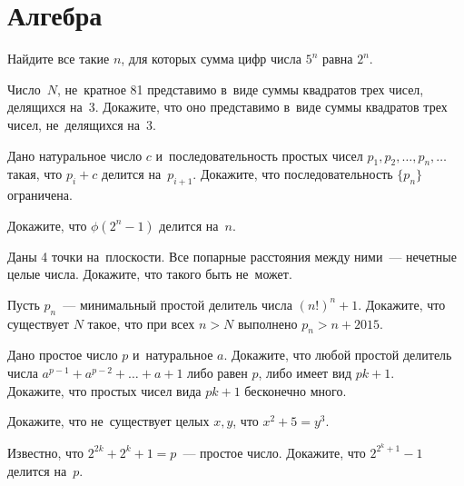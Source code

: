 

\section*{Алгебра}


\begin{problems}

\item
Найдите все такие $n$, для которых сумма цифр числа $5^n$ равна $2^n$.

\item
Число~$N$, не~кратное 81 представимо в~виде суммы квадратов трех чисел,
делящихся на~3.
Докажите, что оно представимо в~виде суммы квадратов трех чисел, не~делящихся
на~3.

\item
Дано натуральное число $c$ и~последовательность простых чисел
$p_1, p_2, \ldots, p_n, \ldots$ такая, что $p_i + c$ делится на~$p_{i+1}$.
Докажите, что последовательность $\{p_n\}$ ограничена.

\item
Докажите, что $\phi(2^n - 1)$ делится на~$n$.

\item
Даны 4 точки на~плоскости.
Все попарные расстояния между ними~--- нечетные целые числа.
Докажите, что такого быть не~может. 

\item
Пусть $p_n$~--- минимальный простой делитель числа $(n!)^n + 1$.
Докажите, что существует $N$ такое, что при всех $n > N$ выполнено
$p_n > n + 2015$.

\item
\subproblem
Дано простое число $p$ и~натуральное $a$.
Докажите, что любой простой делитель числа $a^{p-1} + a^{p-2} + \ldots + a + 1$
либо равен $p$, либо имеет вид $p k + 1$.
\\
\subproblem
Докажите, что простых чисел вида $p k + 1$ бесконечно много.

\item
Докажите, что не~существует целых $x, y$, что $x^2 + 5 = y^3$.

\item
Известно, что $2^{2k} + 2^k + 1 = p$~--- простое число.
Докажите, что $2^{2^k+1} - 1$ делится на~$p$.

\end{problems}

